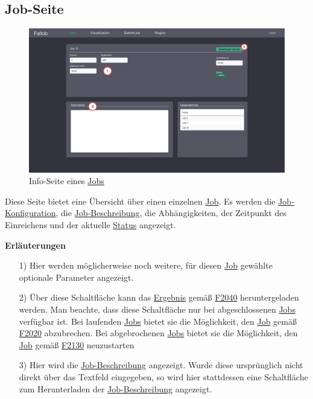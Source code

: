 \subsection{Job-Seite}
\label{pages:job-page}
\begin{figure}[H]
    \centering
    \includegraphics[width=\textwidth]{images-interface/v5_interface/job_info_page_5.pdf}
    \caption{Info-Seite eines \hyperref[B:Jobs]{Jobs}}
    \label{fig:job-page}
\end{figure}
Diese Seite bietet eine Übersicht über einen einzelnen \hyperref[B:Jobs]{Job}. Es werden die \hyperref[B:Job-Konfiguration]{Job-Konfiguration}, die \hyperref[B:Job-Beschreibung]{Job-Beschreibung}, die Abhängigkeiten, der Zeitpunkt des Einreichens und der aktuelle \hyperref[B:Job-Status]{Status} angezeigt.

\textbf{Erläuterungen}
\begin{itemize}
    \item[1)] Hier werden möglicherweise noch weitere, für diesen \hyperref[B:Jobs]{Job} gewählte optionale Parameter angezeigt.
    \item[2)] Über diese Schaltfläche kann das \hyperref[B:Job-Ergebnis]{Ergebnis} gemäß \hyperref[FA:Web-Interface:Herunterladen eines einzelnen Ergebnisses]{F2040} heruntergeladen werden. Man beachte, dass diese Schaltfläche nur bei abgeschlossenen \hyperref[B:Jobs]{Jobs} verfügbar ist. Bei laufenden \hyperref[B:Jobs]{Jobs} bietet sie die Möglichkeit, den \hyperref[B:Jobs]{Job} gemäß \hyperref[FA:Web-Interface:Abbruch eines einzelnen Jobs]{F2020} abzubrechen. Bei abgebrochenen \hyperref[B:Jobs]{Jobs} bietet sie die Möglichkeit, den \hyperref[B:Jobs]{Job} gemäß \hyperref[FA:Web-Interface:Neustart]{F2130} neuzustarten
    \item[3)] Hier wird die \hyperref[B:Job-Beschreibung]{Job-Beschreibung} angezeigt. Wurde diese ursprünglich nicht direkt über das Textfeld eingegeben, so wird hier stattdessen eine Schaltfläche zum Herunterladen der \hyperref[B:Job-Beschreibung]{Job-Beschreibung} angezeigt.
\end{itemize}

